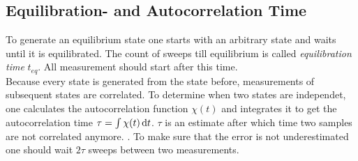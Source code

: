 \subsection{Equilibration- and Autocorrelation Time}
    To generate an equilibrium state one starts with an arbitrary state
    and waits until it is equilibrated. The count of sweeps till
    equilibrium is called \emph{equilibration time} \(t_{eq}\).
    All measurement should start after this time.
    \\
    Because every state is generated from the state before, measurements
    of subsequent states are correlated. To determine when two states
    are independet, one calculates the autocorrelation function \(\chi(t)\)
    and integrates it to get the autocorrelation time \(\tau = \int \chi(t) \,\mathrm{d} t\).
    \(\tau\) is an estimate after which time two samples are not
    correlated anymore. \cite[S. ??]{NewmanBarkema1999} \cite[S. 150f]{Katzgraber2011}.
    To make sure that the error is not underestimated one should wait
    \(2\tau\) sweeps between two measurements.

